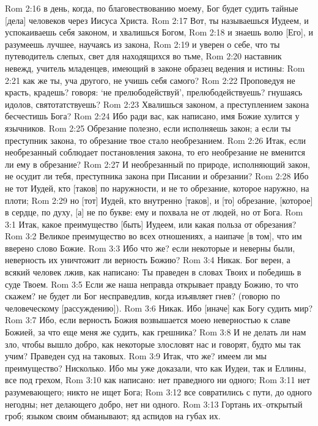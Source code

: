 Rom 2:16  в день, когда, по благовествованию моему, Бог будет судить тайные [дела] человеков через Иисуса Христа.
Rom 2:17  Вот, ты называешься Иудеем, и успокаиваешь себя законом, и хвалишься Богом,
Rom 2:18  и знаешь волю [Его], и разумеешь лучшее, научаясь из закона,
Rom 2:19  и уверен о себе, что ты путеводитель слепых, свет для находящихся во тьме,
Rom 2:20  наставник невежд, учитель младенцев, имеющий в законе образец ведения и истины:
Rom 2:21  как же ты, уча другого, не учишь себя самого?
Rom 2:22  Проповедуя не красть, крадешь? говоря: `не прелюбодействуй', прелюбодействуешь? гнушаясь идолов, святотатствуешь?
Rom 2:23  Хвалишься законом, а преступлением закона бесчестишь Бога?
Rom 2:24  Ибо ради вас, как написано, имя Божие хулится у язычников.
Rom 2:25  Обрезание полезно, если исполняешь закон; а если ты преступник закона, то обрезание твое стало необрезанием.
Rom 2:26  Итак, если необрезанный соблюдает постановления закона, то его необрезание не вменится ли ему в обрезание?
Rom 2:27  И необрезанный по природе, исполняющий закон, не осудит ли тебя, преступника закона при Писании и обрезании?
Rom 2:28  Ибо не тот Иудей, кто [таков] по наружности, и не то обрезание, которое наружно, на плоти;
Rom 2:29  но [тот] Иудей, кто внутренно [таков], и [то] обрезание, [которое] в сердце, по духу, [а] не по букве: ему и похвала не от людей, но от Бога.
Rom 3:1  Итак, какое преимущество [быть] Иудеем, или какая польза от обрезания?
Rom 3:2  Великое преимущество во всех отношениях, а наипаче [в том], что им вверено слово Божие.
Rom 3:3  Ибо что же? если некоторые и неверны были, неверность их уничтожит ли верность Божию?
Rom 3:4  Никак. Бог верен, а всякий человек лжив, как написано: Ты праведен в словах Твоих и победишь в суде Твоем.
Rom 3:5  Если же наша неправда открывает правду Божию, то что скажем? не будет ли Бог несправедлив, когда изъявляет гнев? (говорю по человеческому [рассуждению]).
Rom 3:6  Никак. Ибо [иначе] как Богу судить мир?
Rom 3:7  Ибо, если верность Божия возвышается моею неверностью к славе Божией, за что еще меня же судить, как грешника?
Rom 3:8  И не делать ли нам зло, чтобы вышло добро, как некоторые злословят нас и говорят, будто мы так учим? Праведен суд на таковых.
Rom 3:9  Итак, что же? имеем ли мы преимущество? Нисколько. Ибо мы уже доказали, что как Иудеи, так и Еллины, все под грехом,
Rom 3:10  как написано: нет праведного ни одного;
Rom 3:11  нет разумевающего; никто не ищет Бога;
Rom 3:12  все совратились с пути, до одного негодны; нет делающего добро, нет ни одного.
Rom 3:13  Гортань их--открытый гроб; языком своим обманывают; яд аспидов на губах их.
